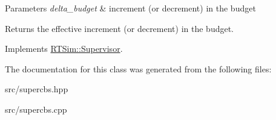 \begin{DoxyParams}{Parameters}
{\em delta\+\_\+budget} & increment (or decrement) in the budget\\
\hline
\end{DoxyParams}
\begin{DoxyReturn}{Returns}
the effective increment (or decrement) in the budget. 
\end{DoxyReturn}


Implements \hyperlink{classRTSim_1_1Supervisor}{R\+T\+Sim\+::\+Supervisor}.



The documentation for this class was generated from the following files\+:\begin{DoxyCompactItemize}
\item 
src/supercbs.\+hpp\item 
src/supercbs.\+cpp\end{DoxyCompactItemize}

